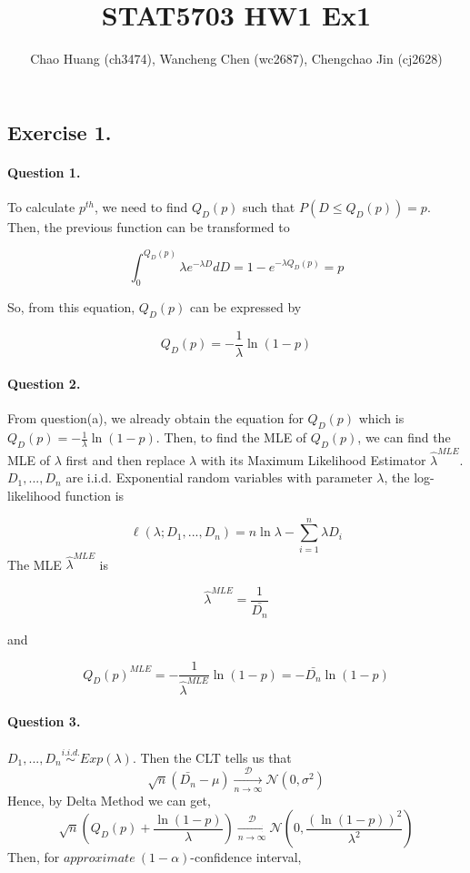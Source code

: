 \documentclass[
]{article}
\title{STAT5703 HW1 Ex1}
\author{Chao Huang (ch3474), Wancheng Chen (wc2687), Chengchao Jin
(cj2628)}
\date{}
\begin{document}
\maketitle

\hypertarget{exercise-1.}{%
\subsection{Exercise 1.}\label{exercise-1.}}

\hypertarget{question-1.}{%
\paragraph{Question 1.}\label{question-1.}}

To calculate \(p^{th}\), we need to find \(Q_D(p)\) such that
\(P(D\leq Q_D(p))=p\). Then, the previous function can be transformed to

\[\int_{0}^{Q_D(p)}\lambda e^{-\lambda D}dD=1-e^{-\lambda Q_D(p)}=p\]

So, from this equation, \(Q_D(p)\) can be expressed by

\[Q_D(p)=-\frac{1}{\lambda}\ln{(1-p)}\]

\hypertarget{question-2.}{%
\paragraph{Question 2.}\label{question-2.}}

From question(a), we already obtain the equation for \(Q_D(p)\) which is
\(Q_D(p)=-\frac{1}{\lambda}\ln{(1-p)}\). Then, to find the MLE of
\(Q_D(p)\), we can find the MLE of \(\lambda\) first and then replace
\(\lambda\) with its Maximum Likelihood Estimator \(\hat\lambda^{MLE}\).
\(D_1,...,D_n\) are i.i.d. Exponential random variables with parameter
\(\lambda\), the log-likelihood function is

\[\ell (\lambda ;D_1,...,D_n)=n\ln{\lambda}-\sum_{i=1}^n\lambda D_i\]
The MLE \(\hat\lambda^{MLE}\) is

\[\hat\lambda^{MLE}=\frac{1}{\bar{D_n}}\]

and

\[Q_D(p)^{MLE}=-\frac{1}{\hat\lambda^{MLE}}\ln{(1-p)}=-\bar{D_n}\ln{(1-p)}\]

\hypertarget{question-3.}{%
\paragraph{Question 3.}\label{question-3.}}

\(D_1,...,D_n\overset{i.i.d.}{\sim}Exp(\lambda)\). Then the CLT tells us
that
\[\sqrt{n}(\bar{D_n}-\mu)\xrightarrow[n\rightarrow \infty]{\mathcal{D}}\mathcal{N}(0,\sigma^2)\]
Hence, by Delta Method we can get,
\[\sqrt{n}(Q_D(p)+\frac{\ln{(1-p)}}{\lambda})\xrightarrow[n\rightarrow \infty]{\mathcal{D}}\mathcal{N}(0,\frac{(\ln{(1-p)})^2}{\lambda^2})\]
Then, for \(approximate\ (1-\alpha)\)-confidence interval,
\end{document}
